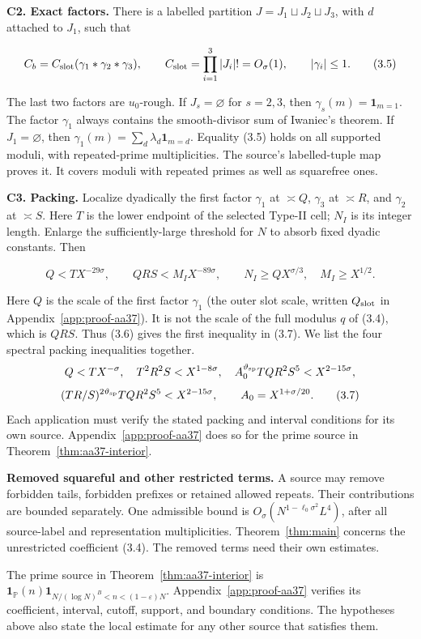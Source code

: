 \textbf{C2. Exact factors.} There is a labelled partition
$J=J_1\sqcup J_2\sqcup J_3$, with $d$ attached to $J_1$, such that

\[
C_b=C_{\rm slot}(\gamma_1*\gamma_2*\gamma_3),\qquad
C_{\rm slot}=\prod_{i=1}^3|J_i|!=O_\sigma(1),\qquad |\gamma_i|\le1.
\tag{3.5}
\]

The last two factors are $u_0$-rough. If $J_s=\varnothing$ for $s=2,3$, then $\gamma_s(m)=\mathbf1_{m=1}$. The factor $\gamma_1$ always contains the smooth-divisor sum of Iwaniec's theorem. If $J_1=\varnothing$, then $\gamma_1(m)=\sum_d\lambda_d\mathbf1_{m=d}$.
Equality (3.5) holds on all supported moduli,
with repeated-prime multiplicities.
The source's labelled-tuple map proves it.
It covers moduli with repeated primes as well as squarefree ones.

\textbf{C3. Packing.} Localize dyadically the first factor $\gamma_1$
at $\asymp Q$, $\gamma_3$ at $\asymp R$, and $\gamma_2$
at $\asymp S$. Here $T$ is the lower endpoint of the selected Type-II
cell; $N_I$ is its integer length.
Enlarge the sufficiently-large threshold for $N$ to absorb fixed dyadic constants. Then

\[
Q<TX^{-29\sigma},\qquad QRS<M_I X^{-89\sigma},
\qquad N_I\ge QX^{\sigma/3},\quad M_I\ge X^{1/2}.
\tag{3.6}
\]

Here $Q$ is the scale of the first factor $\gamma_1$ (the outer
slot scale, written $Q_{\rm slot}$ in Appendix~\ref{app:proof-aa37}).
It is not the scale of the full modulus $q$ of (3.4), which is $QRS$.
Thus (3.6) gives the first inequality in (3.7).
We list the four spectral packing inequalities together.
\[
Q<TX^{-\sigma},\quad T^2R^2S<X^{1-8\sigma},
\quad A_0^{\vartheta_{\rm sp}} TQR^2S^5<X^{2-15\sigma},
\]
\[
(TR/S)^{2\vartheta_{\rm sp}}TQR^2S^5<X^{2-15\sigma},
\qquad A_0=X^{1+\sigma/20}.
\tag{3.7}
\]
Each application must verify the stated packing and interval
conditions for its own source. Appendix~\ref{app:proof-aa37} does so
for the prime source in Theorem~\ref{thm:aa37-interior}.

\textbf{Removed squareful and other restricted terms.}
A source may remove forbidden tails, forbidden prefixes or
retained allowed repeats.
Their contributions are bounded separately.
One admissible bound is $O_\sigma(N^{1-\ell_0\sigma^2}L^4)$,
after all source-label and representation multiplicities.
Theorem~\ref{thm:main} concerns the unrestricted coefficient (3.4).
The removed terms need their own estimates.

The prime source in Theorem~\ref{thm:aa37-interior} is
$\mathbf1_{\mathbb P}(n)\mathbf1_{N/(\log N)^B<n<(1-\varepsilon)N}$.
Appendix~\ref{app:proof-aa37} verifies its coefficient, interval,
cutoff, support, and boundary conditions. The hypotheses above also
state the local estimate for any other source that satisfies them.

